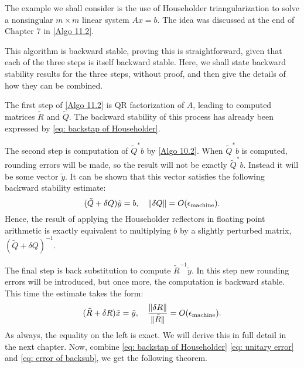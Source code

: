 The example we shall consider is the use of Householder triangularization to solve a nonsingular $m\times m$ linear system $Ax=b$. The idea was discussed at the end of Chapter 7 in \autoref{Algo 11.2}. 

This algorithm is backward stable, proving this is straightforward, given that each of the three steps is itself backward stable. Here, we shall state backward stability results for the three steps, without proof, and then give the details of how they can be combined. 

The first step of \autoref{Algo 11.2} is QR factorization of $A$, leading to computed matrices $\tilde R$ and $\tilde Q$. The backward stability of this process has already been expressed by \autoref{eq: backstap of Householder}.  

The second step is computation of $\tilde Q^* b$ by \autoref{Algo 10.2}. When $\tilde Q^* b$ is computed, rounding errors will be made, so the result will not be exactly $\tilde Q ^* b$. Instead it will be some vector $\tilde y$. It can be shown that this vector satisfies the following backward stability estimate: 
\begin{equation}
    \label{eq: unitary error}
    (\tilde Q + \delta Q) \tilde y = b, \quad \|\delta  Q\| = O(\epsilon_{\text{machine}}). 
\end{equation}
Hence, the result of applying the Householder reflectors in floating point arithmetic is exactly equivalent to multiplying $b$ by a slightly perturbed matrix, $(\tilde Q + \delta  Q)^{-1} $.  

The final step is back substitution to compute $\tilde R ^{-1}  \tilde y$. In this step new rounding errors will be introduced, but once more, the computation is backward stable. This time the estimate takes the form: 
\begin{equation}
    \label{eq: error of backsub} 
    (\tilde R + \delta R) \tilde x = \tilde y, \quad \frac{\|\delta  R\|}{\|\tilde R\|}= O(\epsilon_{\text{machine}}).  
\end{equation}
As always, the equality on the left is exact. We will derive this in full detail in the next chapter. Now, combine \eqref{eq: backstap of Householder} \eqref{eq: unitary error} and \eqref{eq: error of backsub}, we get the following theorem.  


